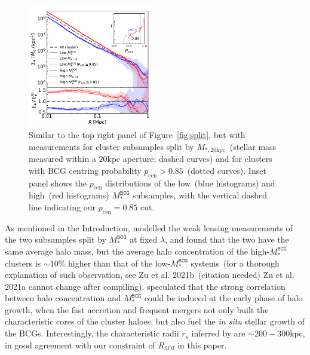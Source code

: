 \documentclass[fleqn,usenatbib]{mnras}
\newcommand{\rsoi}{R_{\mathrm{SOI}}}
\newcommand{\msbcg}{M_*^{\texttt{BCG}}}
\newcommand{\mtwenty}{M_{*,20\kpc}}
\newcommand{\kpc}{\mathrm{kpc}}
\newcommand{\pcen}{p_{\mathrm{cen}}}
\newcommand\xkchen[1]{{\color{cyan} {#1}}}
\newcommand*\citeme{{\color{green}(citation needed)}}
\begin{document}
\begin{figure}
    \hspace{-0.5cm}\includegraphics[width=0.48\textwidth]{fig/M-bin_SM_compare.pdf}
    \caption{Similar to the top right panel of Figure~\ref{fig:split}, but
    with measurements for cluster subsamples split by $\mtwenty$~(stellar
    mass measured within a $20\kpc$ aperture; dashed curves) and for
    clusters with BCG centring probability $\pcen{>}0.85$~(dotted curves).
    Inset panel shows the $\pcen$ distributions of the low~(blue
    histograms) and high~(red histograms) $\msbcg$ subsamples, with the
    vertical dashed line indicating our $\pcen{=}0.85$ cut.
    \label{fig:systest} }
\end{figure}


As mentioned in the Introduction,  modelled the weak
lensing measurements of the two subsamples split by $\msbcg$ at fixed
$\lambda$, and found that the two have the same average halo mass, but the
average halo concentration of the high-$\msbcg$ clusters is
${\sim}10\%$ higher than that of the low-$\msbcg$ systems~(for a thorough
explanation of such observation, see Zu et al. 2021b~\citeme \xkchen{\citep{Zu2021b} } \xkchen{Zu et al. 2021a cannot change after compiling}).
 speculated that the strong correlation between halo
concentration and $\msbcg$ could be induced at the early phase of halo
growth, when the fast accretion and frequent mergers not only built the
characteristic cores of the cluster haloes, but also fuel the {\it in situ}
stellar growth of the BCGs. Interestingly, the characteristic radii $r_s$
inferred by  are ${\sim}200{-}300\kpc$, in good
agreement with our constraint of $\rsoi$ in this paper.
\end{document}
